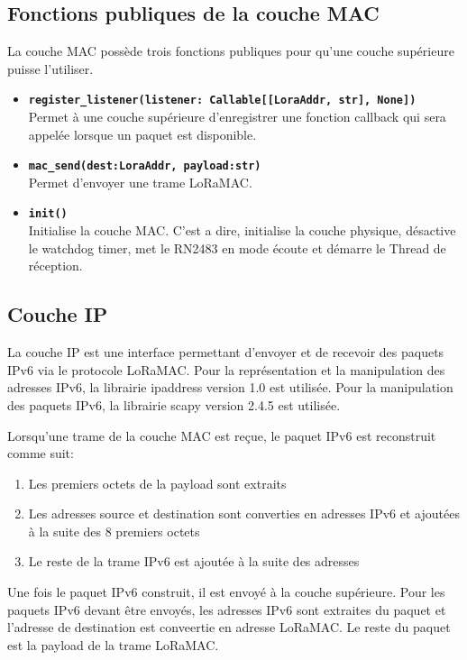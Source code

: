     \subsection*{Fonctions publiques de la couche MAC}
        La couche MAC possède trois fonctions publiques pour qu'une couche supérieure puisse l'utiliser.
        \begin{itemize}
            \item \textbf{\texttt{register\_listener(listener: Callable[[LoraAddr, str], None])}}\\
                Permet à une couche supérieure d'enregistrer une fonction callback qui sera appelée lorsque un paquet est disponible.
            \item \textbf{\texttt{mac\_send(dest:LoraAddr, payload:str)}}\\
                Permet d'envoyer une trame LoRaMAC.
            \item \textbf{\texttt{init()}}\\
                Initialise la couche MAC. C'est a dire, initialise la couche physique,
                désactive le watchdog timer, met le RN2483 en mode écoute et démarre le Thread de réception.
        \end{itemize}
        
\subsection*{Couche IP}\label{subsec:work-loraroot:iplayer}
        La couche IP est une interface permettant d'envoyer et de recevoir des paquets IPv6 via le protocole LoRaMAC. Pour la représentation et la manipulation des adresses IPv6, la librairie ipaddress version 1.0 est utilisée. Pour la manipulation des paquets IPv6, la librairie scapy version 2.4.5 est utilisée.

        Lorsqu'une trame de la couche MAC est reçue, le paquet IPv6 est reconstruit comme suit:
        \begin{enumerate}
            \item Les premiers octets de la payload sont extraits
            \item Les adresses source et destination sont converties en adresses IPv6 et ajoutées à la suite des 8 premiers octets
            \item Le reste de la trame IPv6 est ajoutée à la suite des adresses
        \end{enumerate}
        
        Une fois le paquet IPv6 construit, il est envoyé à la couche supérieure.
        Pour les paquets IPv6 devant être envoyés, les adresses IPv6 sont extraites du paquet et l'adresse de destination est conveertie en adresse LoRaMAC. Le reste du paquet est la payload de la trame LoRaMAC.


